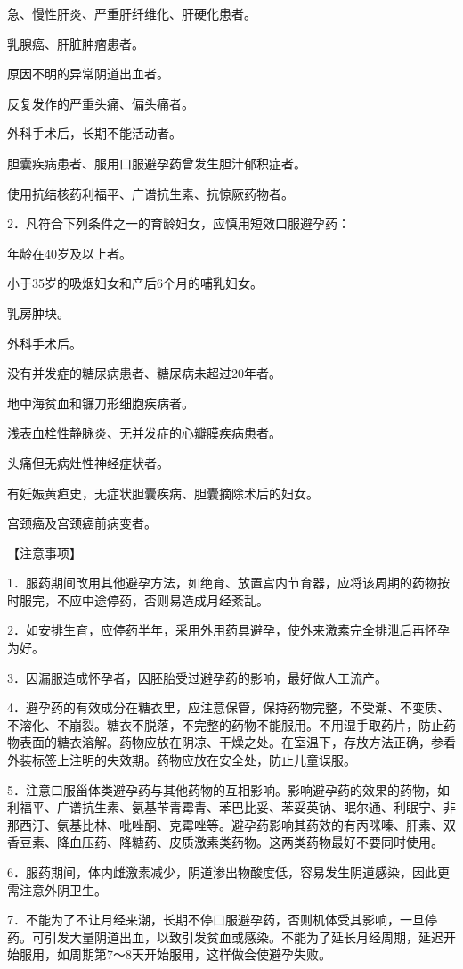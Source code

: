 \documentclass[12pt,UTF8,openany]{ctexbook}
\begin{document}
急、慢性肝炎、严重肝纤维化、肝硬化患者。

乳腺癌、肝脏肿瘤患者。

原因不明的异常阴道出血者。

反复发作的严重头痛、偏头痛者。

外科手术后，长期不能活动者。

胆囊疾病患者、服用口服避孕药曾发生胆汁郁积症者。

使用抗结核药利福平、广谱抗生素、抗惊厥药物者。

2．凡符合下列条件之一的育龄妇女，应慎用短效口服避孕药：

年龄在40岁及以上者。

小于35岁的吸烟妇女和产后6个月的哺乳妇女。

乳房肿块。

外科手术后。

没有并发症的糖尿病患者、糖尿病未超过20年者。

地中海贫血和镰刀形细胞疾病者。

浅表血栓性静脉炎、无并发症的心瓣膜疾病患者。

头痛但无病灶性神经症状者。

有妊娠黄疸史，无症状胆囊疾病、胆囊摘除术后的妇女。

宫颈癌及宫颈癌前病变者。

【注意事项】

1．服药期间改用其他避孕方法，如绝育、放置宫内节育器，应将该周期的药物按时服完，不应中途停药，否则易造成月经紊乱。

2．如安排生育，应停药半年，采用外用药具避孕，使外来激素完全排泄后再怀孕为好。

3．因漏服造成怀孕者，因胚胎受过避孕药的影响，最好做人工流产。

4．避孕药的有效成分在糖衣里，应注意保管，保持药物完整，不受潮、不变质、不溶化、不崩裂。糖衣不脱落，不完整的药物不能服用。不用湿手取药片，防止药物表面的糖衣溶解。药物应放在阴凉、干燥之处。在室温下，存放方法正确，参看外装标签上注明的失效期。药物应放在安全处，防止儿童误服。

5．注意口服甾体类避孕药与其他药物的互相影响。影响避孕药的效果的药物，如利福平、广谱抗生素、氨基苄青霉青、苯巴比妥、苯妥英钠、眠尔通、利眠宁、非那西汀、氨基比林、吡唑酮、克霉唑等。避孕药影响其药效的有丙咪嗪、肝素、双香豆素、降血压药、降糖药、皮质激素类药物。这两类药物最好不要同时使用。

6．服药期间，体内雌激素减少，阴道渗出物酸度低，容易发生阴道感染，因此更需注意外阴卫生。

7．不能为了不让月经来潮，长期不停口服避孕药，否则机体受其影响，一旦停药。可引发大量阴道出血，以致引发贫血或感染。不能为了延长月经周期，延迟开始服用，如周期第7～8天开始服用，这样做会使避孕失败。
\end{document}
